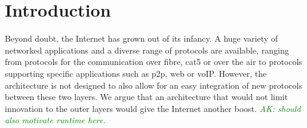\documentclass{sig-alternate}
\newcommand{\ariane}[1]{\textcolor{green}{\emph{AK: #1}}}
\begin{document}



\section{Introduction}

Beyond doubt, the Internet has grown out of its infancy. A huge variety of networked applications and a diverse range of protocols are available, ranging from protocols for the communication over fibre, cat5 or over the air to protocols supporting specific applications such as p2p, web or voIP. However, the architecture is not designed to also allow for an easy integration of new protocols between these two layers. We argue that an architecture that would not limit innovation to the outer layers would give the Internet another boost.
\ariane{should also motivate runtime here.}
\end{document}

